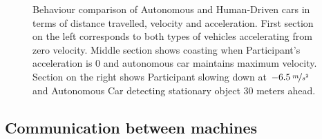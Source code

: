 \documentclass[11pt,english]{article}
\begin{document}
\begin{figure}[!] %
\caption{Behaviour comparison of Autonomous and Human-Driven cars in terms of distance travelled, velocity and acceleration. First section on the left corresponds to both types of vehicles accelerating from zero velocity. Middle section shows coasting when Participant's acceleration is 0 and autonomous car maintains maximum velocity. Section on the right shows Participant slowing down at $-6.5\:\nicefrac{m}{s^2}$ and Autonomous Car detecting stationary object 30 meters ahead.}
\label{fig:super_graph}
\end{figure} 






\subsection{Communication between machines}
\end{document}

